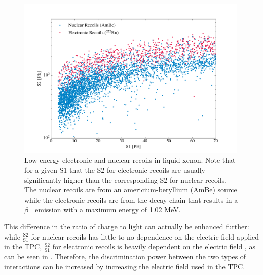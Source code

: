 \begin{figure}[t]
	\centering
	\includegraphics[width=0.99\textwidth]{xe1t_disc}
	\caption{Low energy electronic and nuclear recoils in liquid xenon.  Note that for a given S1 that the S2 for electronic recoils are usually significantly higher than the corresponding S2 for nuclear recoils.  The nuclear recoils are from an americium-beryllium (AmBe) source while the electronic recoils are from the  decay chain that results in a $\beta^-$ emission with a maximum energy of 1.02 MeV.}
	\label{fig:xe1t_disc}
\end{figure}

This difference in the ratio of charge to light can actually be enhanced further: while $\frac{\textrm{S2}}{\textrm{S1}}$ for nuclear recoils has little to no dependence on the electric field applied in the TPC, $\frac{\textrm{S2}}{\textrm{S1}}$ for electronic recoils is heavily dependent on the electric field \cite{aprile2006simultaneous, goetzke2016measurement}, as can be seen in .  Therefore, the discrimination power between the two types of interactions can be increased by increasing the electric field used in the TPC.


